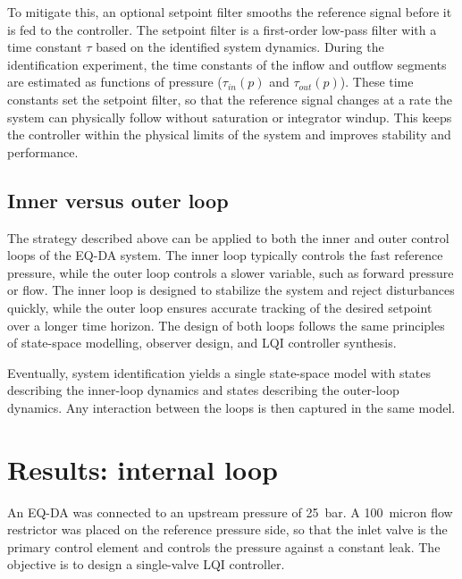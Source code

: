 \documentclass[12pt,a4paper]{article}
\begin{document}
To mitigate this, an optional setpoint filter smooths the reference signal before it is fed to the controller. The setpoint filter is a first-order low-pass filter with a time constant $\tau$ based on the identified system dynamics. During the identification experiment, the time constants of the inflow and outflow segments are estimated as functions of pressure ($\tau_{in}(p)$ and $\tau_{out}(p)$). These time constants set the setpoint filter, so that the reference signal changes at a rate the system can physically follow without saturation or integrator windup. This keeps the controller within the physical limits of the system and improves stability and performance.

\subsection{Inner versus outer loop}
The strategy described above can be applied to both the inner and outer control loops of the EQ-DA system. The inner loop typically controls the fast reference pressure, while the outer loop controls a slower variable, such as forward pressure or flow. The inner loop is designed to stabilize the system and reject disturbances quickly, while the outer loop ensures accurate tracking of the desired setpoint over a longer time horizon. The design of both loops follows the same principles of state-space modelling, observer design, and LQI controller synthesis.

Eventually, system identification yields a single state-space model with states describing the inner-loop dynamics and states describing the outer-loop dynamics. Any interaction between the loops is then captured in the same model.

\newpage
\section{Results: internal loop}
An EQ-DA was connected to an upstream pressure of 25~bar. A 100~micron flow restrictor was placed on the reference pressure side, so that the inlet valve is the primary control element and controls the pressure against a constant leak. The objective is to design a single-valve LQI controller.
\end{document}
